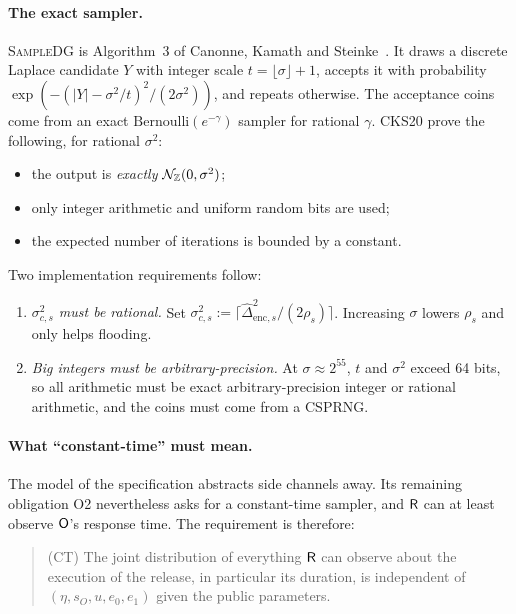 \paragraph{The exact sampler.}
\textsc{SampleDG} is Algorithm~3 of Canonne, Kamath and Steinke~\cite{CKS20}. It draws a discrete Laplace candidate $Y$ with integer scale $t=\lfloor\sigma\rfloor+1$, accepts it with probability $\exp(-(|Y|-\sigma^2/t)^2/(2\sigma^2))$, and repeats otherwise. The acceptance coins come from an exact $\mathrm{Bernoulli}(e^{-\gamma})$ sampler for rational $\gamma$. CKS20 prove the following, for rational $\sigma^2$:
\begin{itemize}[nosep]
  \item the output is \emph{exactly} $\mathcal{N}_{\mathbb{Z}}(0,\sigma^2)$;
  \item only integer arithmetic and uniform random bits are used;
  \item the expected number of iterations is bounded by a constant.
\end{itemize}

Two implementation requirements follow:
\begin{enumerate}[nosep,label=(\roman*)]
  \item \emph{$\sigma_{c,s}^2$ must be rational.} Set $\sigma_{c,s}^2:=\lceil\widehat\Delta_{\mathrm{enc},s}^2/(2\rho_s)\rceil$. Increasing $\sigma$ lowers $\rho_s$ and only helps flooding.
  \item \emph{Big integers must be arbitrary-precision.} At $\sigma\approx2^{55}$, $t$ and $\sigma^2$ exceed 64 bits, so all arithmetic must be exact arbitrary-precision integer or rational arithmetic, and the coins must come from a CSPRNG.
\end{enumerate}

\paragraph{What ``constant-time'' must mean.}
The model of the specification abstracts side channels away. Its remaining obligation O2 nevertheless asks for a constant-time sampler, and $\mathsf{R}$ can at least observe $\mathsf{O}$'s response time. The requirement is therefore:
\begin{quote}
(CT) The joint distribution of everything $\mathsf{R}$ can observe about the execution of the release, in particular its duration, is independent of $(\eta,s_O,u,e_0,e_1)$ given the public parameters.
\end{quote}

